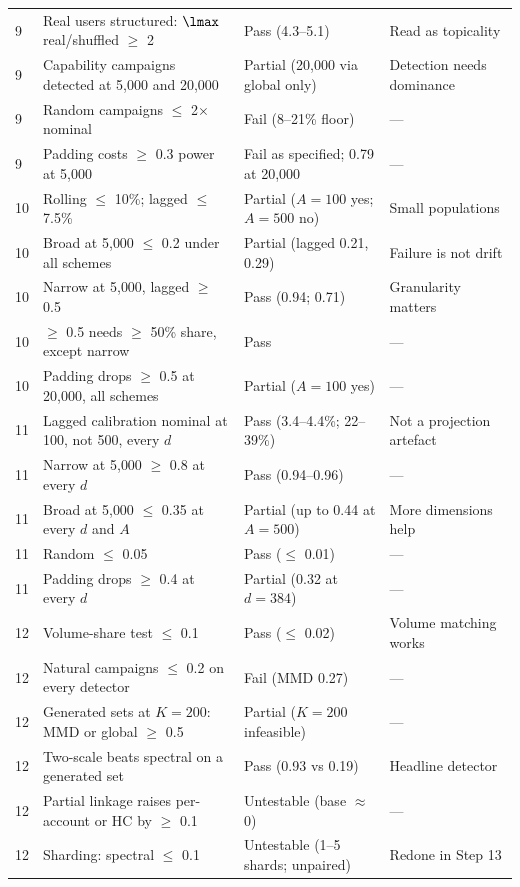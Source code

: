 \begin{longtable}{p{}p{}p{}p{}}
9 & Real users structured: $\lmax$ real/shuffled $\ge$ 2 & Pass (4.3--5.1) & Read as topicality \\
9 & Capability campaigns detected at 5{,}000 and 20{,}000 & Partial (20{,}000 via global only) & Detection needs dominance \\
9 & Random campaigns $\le$ 2$\times$ nominal & Fail (8--21\% floor) & --- \\
9 & Padding costs $\ge$ 0.3 power at 5{,}000 & Fail as specified; 0.79 at 20{,}000 & --- \\
10 & Rolling $\le$ 10\%; lagged $\le$ 7.5\% & Partial ($A=100$ yes; $A=500$ no) & Small populations \\
10 & Broad at 5{,}000 $\le$ 0.2 under all schemes & Partial (lagged 0.21, 0.29) & Failure is not drift \\
10 & Narrow at 5{,}000, lagged $\ge$ 0.5 & Pass (0.94; 0.71) & Granularity matters \\
10 & $\ge$ 0.5 needs $\ge$ 50\% share, except narrow & Pass & --- \\
10 & Padding drops $\ge$ 0.5 at 20{,}000, all schemes & Partial ($A=100$ yes) & --- \\
11 & Lagged calibration nominal at 100, not 500, every $d$ & Pass (3.4--4.4\%; 22--39\%) & Not a projection artefact \\
11 & Narrow at 5{,}000 $\ge$ 0.8 at every $d$ & Pass (0.94--0.96) & --- \\
11 & Broad at 5{,}000 $\le$ 0.35 at every $d$ and $A$ & Partial (up to 0.44 at $A=500$) & More dimensions help \\
11 & Random $\le$ 0.05 & Pass ($\le$ 0.01) & --- \\
11 & Padding drops $\ge$ 0.4 at every $d$ & Partial (0.32 at $d=384$) & --- \\
12 & Volume-share test $\le$ 0.1 & Pass ($\le$ 0.02) & Volume matching works \\
12 & Natural campaigns $\le$ 0.2 on every detector & Fail (MMD 0.27) & --- \\
12 & Generated sets at $K=200$: MMD or global $\ge$ 0.5 & Partial ($K=200$ infeasible) & --- \\
12 & Two-scale beats spectral on a generated set & Pass (0.93 vs 0.19) & Headline detector \\
12 & Partial linkage raises per-account or HC by $\ge$ 0.1 & Untestable (base $\approx$ 0) & --- \\
12 & Sharding: spectral $\le$ 0.1 & Untestable (1--5 shards; unpaired) & Redone in Step 13 \\

\end{longtable}

